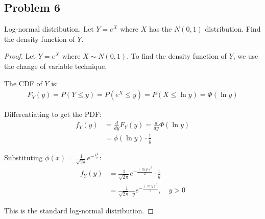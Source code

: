 \documentclass[letterpaper, 11pt]{article}
\newcommand{\1}{\mathds{1}}	%
\theoremstyle{definition}
\begin{document}
\subsection*{Problem 6}
Log-normal distribution. Let $Y=e^{X}$ where $X$ has the $N(0,1)$ distribution. Find the density function of $Y$.
\begin{proof}
    Let $Y = e^X$ where $X \sim N(0,1)$. To find the density function of $Y$, we use the change of variable technique.

The CDF of $Y$ is:
\begin{align*}
F_Y(y) = P(Y \leq y) = P(e^X \leq y) = P(X \leq \ln y) = \Phi(\ln y)
\end{align*}

Differentiating to get the PDF:
\begin{align*}
f_Y(y) &= \frac{d}{dy}F_Y(y) = \frac{d}{dy}\Phi(\ln y)\\
&= \phi(\ln y) \cdot \frac{1}{y}
\end{align*}

Substituting $\phi(x) = \frac{1}{\sqrt{2\pi}}e^{-\frac{x^2}{2}}$:
\begin{align*}
f_Y(y) &= \frac{1}{\sqrt{2\pi}}e^{-\frac{(\ln y)^2}{2}} \cdot \frac{1}{y}\\
&= \frac{1}{\sqrt{2\pi} \cdot y}e^{-\frac{(\ln y)^2}{2}}, \quad y > 0
\end{align*}

This is the standard log-normal distribution.
\end{proof}
\end{document}
